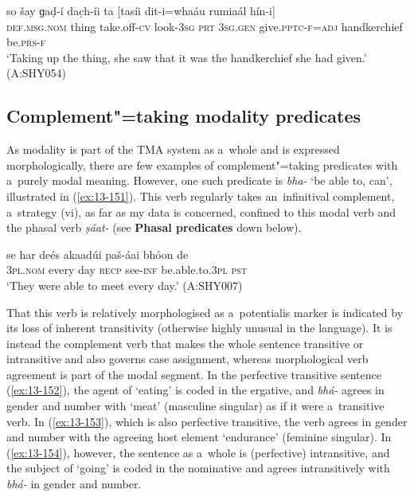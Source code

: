 \begin{exe}
\ex
\label{ex:13-150}
\gll so šay ɡaḍ-í dac̣h-íi ta [tasíi  dit-i=whaáu rumiaál hín-i] \\
\textsc{def.msg.nom} thing take.off-\textsc{cv} look-\textsc{3sg} \textsc{prt} \textsc{3sg.gen} give.\textsc{pptc-f}=\textsc{adj} handkerchief be.\textsc{prs-f} \\
\glt `Taking up the thing, she saw that it was the handkerchief she had given.' (A:SHY054)
\end{exe}

\subsection{Complement"=taking modality predicates}
\label{subsec:13-5-2}

 As modality is part of the TMA system as a~whole and is expressed morphologically, there are few examples of complement"=taking predicates with a~purely modal meaning. However, one such predicate is \textit{bha-} `be able to, can', illustrated in (\ref{ex:13-151}). This verb regularly takes an~infinitival complement, a~strategy (vi), as far as my data is concerned, confined to this modal verb and the phasal verb \textit{ṣáat-} (see \textbf{Phasal predicates} down below).

\begin{exe}
\ex
\label{ex:13-151}
\gll se har deés akaadúi paš-áai bhóon de  \\
\textsc{3pl.nom} every day \textsc{recp} see-\textsc{inf} be.able.to.\textsc{3pl} \textsc{pst} \\
\glt `They were able to meet every day.' (A:SHY007) 
\end{exe}

That this verb is relatively morphologised as a~potentialis marker is indicated by its loss of inherent transitivity (otherwise highly unusual in the language). It is instead the complement verb that makes the whole sentence transitive or intransitive and also governs case assignment, whereas morphological verb agreement is part of the modal segment. In the perfective transitive sentence (\ref{ex:13-152}), the agent of `eating' is coded in the ergative, and \textit{bhá-} agrees in gender and number with `meat' (masculine singular) as if it were a~transitive verb. In (\ref{ex:13-153}), which is also perfective transitive, the verb agrees in gender and number with the agreeing host element `endurance' (feminine singular). In (\ref{ex:13-154}), however, the sentence as a~whole is (perfective) intransitive, and the subject of `going' is coded in the nominative and agrees intransitively with \textit{bhá-} in gender and number.

